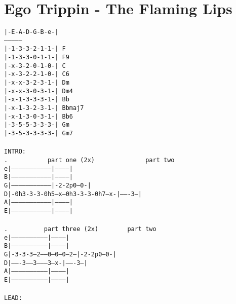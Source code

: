 \newpage
\section{Ego Trippin - The Flaming Lips}
\label{Ego Trippin - The Flaming Lips}
\texttt{|-E-A-D-G-B-e-|\\
---------------\\
|-1-3-3-2-1-1-|\ F\\
|-1-3-3-0-1-1-|\ F9\\
|-x-3-2-0-1-0-|\ C\\
|-x-3-2-2-1-0-|\ C6\\
|-x-x-3-2-3-1-|\ Dm\\
|-x-x-3-0-3-1-|\ Dm4\\
|-x-1-3-3-3-1-|\ Bb\\
|-x-1-3-2-3-1-|\ Bbmaj7\\
|-x-1-3-0-3-1-|\ Bb6\\
|-3-5-5-3-3-3-|\ Gm\\
|-3-5-3-3-3-3-|\ Gm7\\
\\
INTRO:\ \\
.\ \ \ \ \ \ \ \ \ \ \ part\ one\ (2x)\ \ \ \ \ \ \ \ \ \ \ \ \ \ part\ two\ \ \ \ \ \ \ \ \ \ \ \\
e|---------------------------------|-----------|\\
B|---------------------------------|-----------|\\
G|---------------------------------|-2-2p0---0-|\\
D|-0h3-3-3-0h5--x---0h3-3-3-0h7--x-|-------3---|\\
A|---------------------------------|-----------|\\
E|---------------------------------|-----------|\\
\\
.\ \ \ \ \ \ \ \ \ \ part\ three\ (2x)\ \ \ \ \ \ \ \ part\ two\\
e|-----------------------------|-----------|\\
B|-----------------------------|-----------|\\
G|-3-3-3---2-----0--0--0---2---|-2-2p0---0-|\\
D|-------3-----3---------3---x-|-------3---|\\
A|-----------------------------|-----------|\\
E|-----------------------------|-----------|\\
\\
LEAD:\\
}
